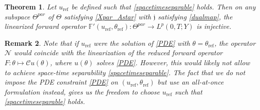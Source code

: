 \documentclass[12pt]{article}
\newtheorem{theorem}{Theorem}[section]
\newtheorem{remark}[theorem]{Remark}
\newcommand\Op{\mathcal{N}}
\newcommand\dualmap{\mathfrak{j}}
\begin{document}
\begin{theorem}\label{thm:lin-uniqueness}
Let $u_{\text{ref}}$ be defined such that \eqref{spacetimeseparable} holds.
Then on any subspace $\Theta^{par}$ of $\Theta$ satisfying \eqref{Xpar_Astar} with $\dualmap$ satisfying \eqref{dualmap}, the linearized forward operator $\mathbb{F}'(u_{\text{ref}},\theta_{\text{ref}}):\Theta^{par}\to L^p(0,T;Y)$ is injective.
\end{theorem}
\begin{remark}\label{rem:Op_reduced}
Note that if $u_{\text{ref}}$ were the solution of \eqref{PDE} with $\theta=\theta_{\text{ref}}$, the operator $\Op$ would coincide with the linearization of the reduced forward operator $F:\theta\mapsto \mathcal{C}u(\theta)$, where $u(\theta)$ solves \eqref{PDE}. However, this would likely not allow to achieve space-time separability \eqref{spacetimeseparable}.
The fact that we do not impose the PDE constraint \eqref{PDE} on $(u_{\text{ref}},\theta_{\text{ref}})$ but use an all-at-once formulation instead, gives us the freedom to choose $u_{\text{ref}}$ such that \eqref{spacetimeseparable} holds.
\end{remark}
\end{document}
